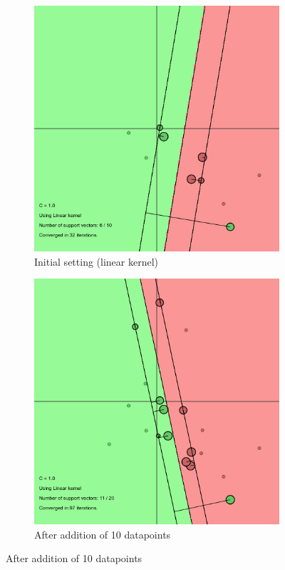 \documentclass[11pt, a4paper]{article}
\begin{document}
\begin{figure}[H]
    \centering
    \begin{subfigure}{.5\textwidth}
      \centering
      \includegraphics[width=0.9\linewidth]{1-2-1-linear.png}
      \caption{Initial setting (linear kernel)}
      \label{fig:lin1}
    \end{subfigure}%
    \begin{subfigure}{.5\textwidth}
      \centering
      \includegraphics[width=0.9\linewidth]{1-2-1-linear_10.png}
      \caption{After addition of 10 datapoints}
      \label{fig:lin2}
    \end{subfigure}
    \label{fig:bull}
\end{figure}
\end{document}
